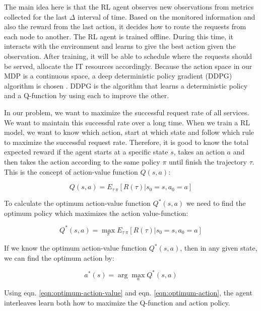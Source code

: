 \documentclass[conference]{IEEEtran}
\begin{document}
The main idea here is that the RL agent observes new observations from metrics collected for the last $\Delta$ interval of time. Based on the monitored information and also the reward from the last action, it decides how to route the requests from each node to another. The RL agent is trained offline. During this time, it interacts with the environment and learns to give the best action given the observation. After training, it will be able to schedule where the requests should be served, allocate the IT resources accordingly. Because the action space in our MDP is a continuous space, a deep deterministic policy gradient (DDPG) algorithm is chosen \cite{Lillicrap2016}. DDPG is the algorithm that learns a deterministic policy and a Q-function by using each to improve the other. 

In our problem, we want to maximize the successful request rate of all services. We want to maintain this successful rate over a long time. When we train a RL model, we want to know which action, start at which state and follow which rule to maximize the successful request rate. Therefore, it is good to know the total expected reward if the agent starts at a specific state $s$, takes an action $a$ and then takes the action according to the same policy $\pi$ until finish the trajectory $\tau$. This is the concept of action-value function $Q(s,a)$:

\begin{equation}
    \label{eqn:action-value}
    Q(s,a) = E_{\tau ~ \pi} [R(\tau) | s_0 = s, a_0 = a]
\end{equation}

To calculate the optimum action-value function $Q^*(s, a)$ we need to find the optimum policy which maximizes the action value-function: 

\begin{equation}
    \label{eqn:optimum-action-value}
    Q^*(s,a) = \max_{\pi} E_{\tau ~ \pi} [R(\tau) | s_0 = s, a_0 = a]
\end{equation}

If we know the optimum action-value function $Q^*(s, a)$, then in any given state, we can find the optimum action by: 

\begin{equation}
    \label{eqn:optimum-action}
    a^*(s) = \arg\max_{a} Q^*(s,a)
\end{equation}

Using eqn. \ref{eqn:optimum-action-value} and eqn. \ref{eqn:optimum-action}, the agent interleaves learn both how to maximize the Q-function and action policy. 
\end{document}
